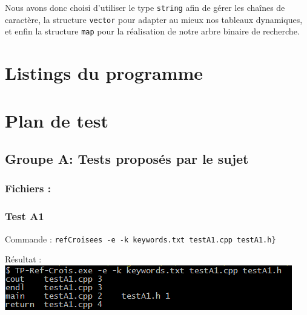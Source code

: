 \documentclass[a4paper,french,10pt,twoside]{article}
\begin{document}
Nous avons donc choisi d'utiliser le type \verb!string! afin de g\'erer les chaînes de caractère, la structure \verb!vector! pour adapter au mieux nos tableaux dynamiques, et enfin la structure \verb!map! pour la r\'ealisation de notre arbre binaire de recherche.

\newpage

\section{Listings du programme}

\newpage

\newpage

\newpage

\newpage

\newpage

\newpage

\newpage

\newpage


\newpage


\newpage
\section{Plan de test}

\subsection{Groupe A: Tests propos\'es par le sujet}

\subsubsection{Fichiers :}



\subsubsection{Test A1}
Commande : \verb!refCroisees -e -k keywords.txt testA1.cpp testA1.h}!

R\'esultat :\\
\newline
\includegraphics{images/testA1.png}
\end{document}
